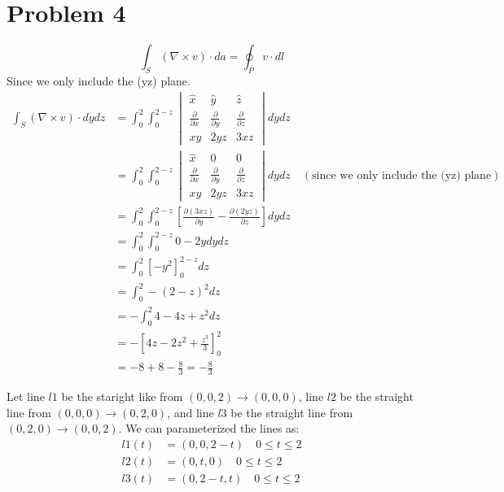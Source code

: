 \documentclass[12pt]{article}
\begin{document}
\section*{Problem 4}
\[\int_{S}^{} (\nabla \times v) \cdot da = \oint_P v \cdot dl\]
Since we only include the (yz) plane.
\begin{align*}
	\int_{S}^{} (\nabla \times v) \cdot dydz &= \int_{0}^{2} \int_{0}^{2-z} \begin{vmatrix}
		\hat{x} & \hat{y} & \hat{z} \\
		\frac{\partial}{\partial x} & \frac{\partial}{\partial y} & \frac{\partial}{\partial z} \\
		xy & 2yz & 3xz
	\end{vmatrix} dy dz \\
	&= \int_{0}^{2} \int_{0}^{2-z} \begin{vmatrix}
		\hat{x} & 0 & 0 \\
		\frac{\partial}{\partial x} & \frac{\partial}{\partial y} & \frac{\partial}{\partial z} \\
		xy & 2yz & 3xz
	\end{vmatrix} dy dz \quad (\text{since we only include the (yz) plane}) \\
	&= \int_{0}^{2} \int_{0}^{2-z} \left[\frac{\partial(3xz)}{\partial y} - \frac{\partial(2yz)}{\partial z}\right] dy dz \\
	&= \int_{0}^{2} \int_{0}^{2-z} 0 - 2y dy dz \\
	&= \int_{0}^{2} \left[-y^2\right]_{0}^{2-z} dz \\
	&= \int_{0}^{2} -(2-z)^2 dz \\
	&= - \int_{0}^{2} 4 - 4z + z^2 dz \\
	&= - \left[4z - 2z^2 + \frac{z^3}{3}\right]_{0}^{2} \\
	&= -8 + 8 - \frac{8}{3} = -\frac{8}{3}
\end{align*}

Let line \(l1\) be the staright like from \((0,0,2) \rightarrow (0,0,0)\), line \(l2\) be the straight line from \((0,0,0) \rightarrow (0,2,0)\), 
and line \(l3\) be the straight line from \((0,2,0) \rightarrow (0,0,2)\). We can parameterized the lines as:
\begin{align*}
	l1(t) &= (0,0,2-t) \quad 0 \leq t \leq 2 \\
	l2(t) &= (0,t,0) \quad 0 \leq t \leq 2 \\
	l3(t) &= (0,2-t,t) \quad 0 \leq t \leq 2
\end{align*}
\end{document}

